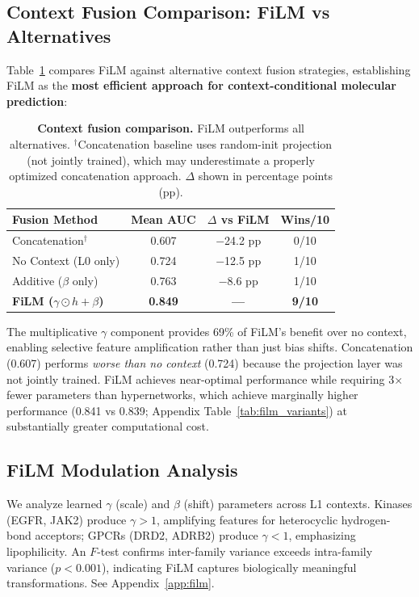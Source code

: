 \documentclass[runningheads]{llncs}
\begin{document}
\subsection{Context Fusion Comparison: FiLM vs Alternatives}

Table~\ref{tab:fusion} compares FiLM against alternative context fusion strategies, establishing FiLM as the \textbf{most efficient approach for context-conditional molecular prediction}:

\begin{table}[t]
\caption{\textbf{Context fusion comparison.} FiLM outperforms all alternatives. $^\dagger$Concatenation baseline uses random-init projection (not jointly trained), which may underestimate a properly optimized concatenation approach. $\Delta$ shown in percentage points (pp).}
\label{tab:fusion}
\centering
\small
\begin{tabular}{@{}lccc@{}}
\toprule
\textbf{Fusion Method} & \textbf{Mean AUC} & \textbf{$\Delta$ vs FiLM} & \textbf{Wins/10} \\
\midrule
Concatenation$^\dagger$ & 0.607 & $-$24.2 pp & 0/10 \\
No Context (L0 only) & 0.724 & $-$12.5 pp & 1/10 \\
Additive ($\beta$ only) & 0.763 & $-$8.6 pp & 1/10 \\
\textbf{FiLM ($\gamma \odot h + \beta$)} & \textbf{0.849} & \textbf{---} & \textbf{9/10} \\
\bottomrule
\end{tabular}
\end{table}

The multiplicative $\gamma$ component provides 69\% of FiLM's benefit over no context, enabling selective feature amplification rather than just bias shifts. Concatenation (0.607) performs \textit{worse than no context} (0.724) because the projection layer was not jointly trained. FiLM achieves near-optimal performance while requiring 3$\times$ fewer parameters than hypernetworks, which achieve marginally higher performance (0.841 vs 0.839; Appendix Table~\ref{tab:film_variants}) at substantially greater computational cost.

\subsection{FiLM Modulation Analysis}

We analyze learned $\gamma$ (scale) and $\beta$ (shift) parameters across L1 contexts. Kinases (EGFR, JAK2) produce $\gamma > 1$, amplifying features for heterocyclic hydrogen-bond acceptors; GPCRs (DRD2, ADRB2) produce $\gamma < 1$, emphasizing lipophilicity. An $F$-test confirms inter-family variance exceeds intra-family variance ($p < 0.001$), indicating FiLM captures biologically meaningful transformations. See Appendix~\ref{app:film}.
\end{document}
